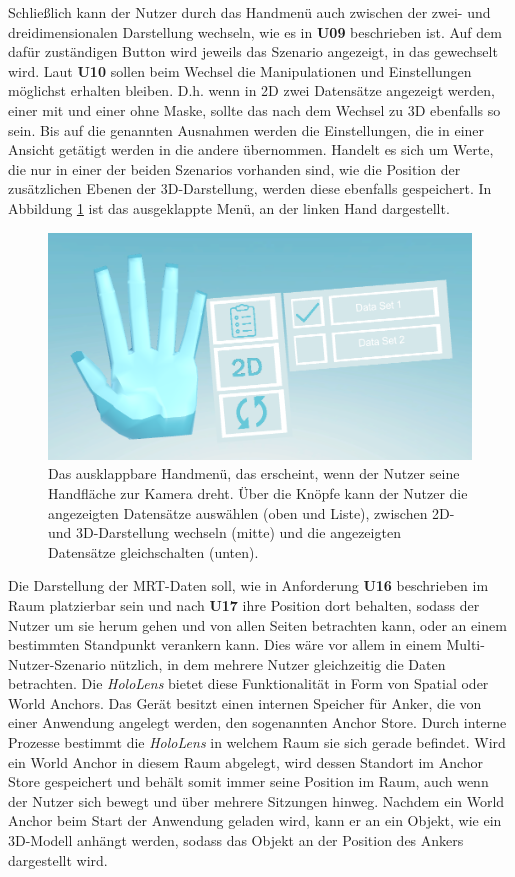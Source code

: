 Schließlich kann der Nutzer durch das Handmenü auch zwischen der zwei- und dreidimensionalen Darstellung wechseln, wie es in \textbf{U09} beschrieben ist. Auf dem dafür zuständigen Button wird jeweils das Szenario angezeigt, in das gewechselt wird.
Laut \textbf{U10} sollen beim Wechsel die Manipulationen und Einstellungen möglichst erhalten bleiben. D.h. wenn in 2D zwei Datensätze angezeigt werden, einer mit und einer ohne Maske, sollte das nach dem Wechsel zu 3D ebenfalls so sein. 
Bis auf die genannten Ausnahmen werden die Einstellungen, die in einer Ansicht getätigt werden in die andere übernommen. Handelt es sich um Werte, die nur in einer der beiden Szenarios vorhanden sind, wie die Position der zusätzlichen Ebenen der 3D-Darstellung, werden diese ebenfalls gespeichert.
In Abbildung \ref{img:handUI} ist das ausgeklappte Menü, an der linken Hand dargestellt.

\begin{figure}[!htb]
	\centering
	\includegraphics[width=0.7\linewidth]{images/handUI.png}
	\caption{Das ausklappbare Handmenü, das erscheint, wenn der Nutzer seine Handfläche zur Kamera dreht. Über die Knöpfe kann der Nutzer die angezeigten Datensätze auswählen (oben und Liste), zwischen 2D- und 3D-Darstellung wechseln (mitte) und die angezeigten Datensätze gleichschalten (unten). }
	\label{img:handUI}
\end{figure}
\FloatBarrier

Die Darstellung der MRT-Daten soll, wie in Anforderung \textbf{U16} beschrieben im Raum platzierbar sein und nach \textbf{U17} ihre Position dort behalten, sodass der Nutzer um sie herum gehen und von allen Seiten betrachten kann, oder an einem bestimmten Standpunkt verankern kann. Dies wäre vor allem in einem Multi-Nutzer-Szenario nützlich, in dem mehrere Nutzer gleichzeitig die Daten betrachten.
Die \textit{HoloLens} bietet diese Funktionalität in Form von Spatial oder World Anchors. Das Gerät besitzt einen internen Speicher für Anker, die von einer Anwendung angelegt werden, den sogenannten Anchor Store. Durch interne Prozesse bestimmt die \textit{HoloLens} in welchem Raum sie sich gerade befindet. Wird ein World Anchor in diesem Raum abgelegt, wird dessen Standort im Anchor Store gespeichert und behält somit immer seine Position im Raum, auch wenn der Nutzer sich bewegt und über mehrere Sitzungen hinweg. Nachdem ein World Anchor beim Start der Anwendung geladen wird, kann er an ein Objekt, wie ein 3D-Modell anhängt werden, sodass das Objekt an der Position des Ankers dargestellt wird. 

